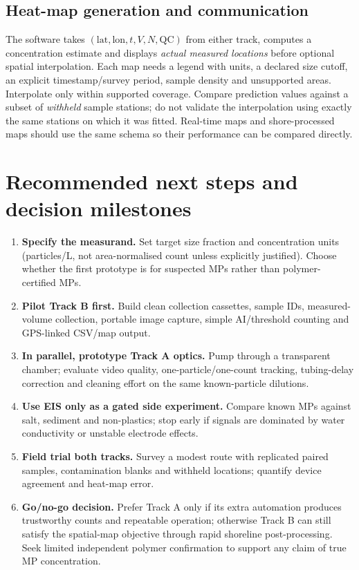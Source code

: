 \documentclass[10pt,a4paper]{article}
\begin{document}
\subsection{Heat-map generation and communication}
The software takes $(\mathrm{lat},\mathrm{lon},t,V,N,\mathrm{QC})$ from either track, computes a concentration estimate and displays \emph{actual measured locations} before optional spatial interpolation. Each map needs a legend with units, a declared size cutoff, an explicit timestamp/survey period, sample density and unsupported areas. Interpolate only within supported coverage. Compare prediction values against a subset of \emph{withheld} sample stations; do not validate the interpolation using exactly the same stations on which it was fitted. Real-time maps and shore-processed maps should use the same schema so their performance can be compared directly.

\section{Recommended next steps and decision milestones}
\begin{enumerate}
\item \textbf{Specify the measurand.} Set target size fraction and concentration units (particles/L, not area-normalised count unless explicitly justified). Choose whether the first prototype is for suspected MPs rather than polymer-certified MPs.
\item \textbf{Pilot Track B first.} Build clean collection cassettes, sample IDs, measured-volume collection, portable image capture, simple AI/threshold counting and GPS-linked CSV/map output.
\item \textbf{In parallel, prototype Track A optics.} Pump through a transparent chamber; evaluate video quality, one-particle/one-count tracking, tubing-delay correction and cleaning effort on the same known-particle dilutions.
\item \textbf{Use EIS only as a gated side experiment.} Compare known MPs against salt, sediment and non-plastics; stop early if signals are dominated by water conductivity or unstable electrode effects.
\item \textbf{Field trial both tracks.} Survey a modest route with replicated paired samples, contamination blanks and withheld locations; quantify device agreement and heat-map error.
\item \textbf{Go/no-go decision.} Prefer Track A only if its extra automation produces trustworthy counts and repeatable operation; otherwise Track B can still satisfy the spatial-map objective through rapid shoreline post-processing. Seek limited independent polymer confirmation to support any claim of true MP concentration.
\end{enumerate}
\end{document}
